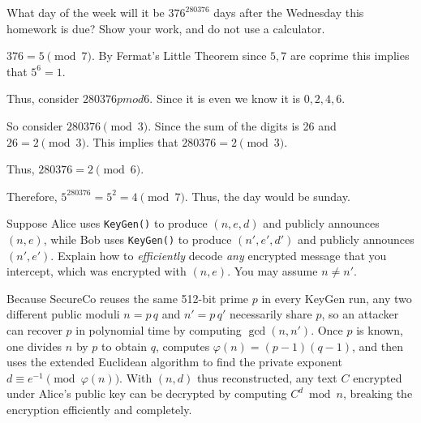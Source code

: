 \documentclass[12pt, letterpaper]{article}
\begin{document}
\begin{subproblem}{}
    What day of the week will it be $376^{280376}$ days after the Wednesday this homework is due?
  Show your work, and do not use a calculator.
\end{subproblem}
\begin{problemproof}
    $376=5 \pmod{7}$. By Fermat's Little Theorem since $5,7$ are coprime this implies that $5^6=1$.

    Thus, consider $280376 pmod{6}$. Since it is even we know it is $0,2,4,6$.

    So consider $280376 \pmod{3}$. Since the sum of the digits is 26 and $26=2 \pmod{3}$. This implies that $280376=2 \pmod{3}$.

    Thus, $280376=2 \pmod{6}$.

    Therefore, $5^{280376}=5^2=4 \pmod{7}$. Thus, the day would be sunday.
\end{problemproof}

\begin{problem}{}
    Suppose Alice uses \texttt{KeyGen()} to produce $(n,e,d)$ and publicly announces $(n,e)$, while Bob uses \texttt{KeyGen()} to produce $(n',e',d')$ and publicly announces $(n',e')$.  Explain how to \emph{efficiently} 
decode \emph{any} encrypted message that 
you intercept, which was encrypted 
with $(n,e)$. You may assume $n\neq n'$.
\end{problem}
\begin{problemproof}
    Because SecureCo reuses the same 512-bit prime \(p\) in every KeyGen run, any two different public moduli \(n = p\,q\) and \(n' = p\,q'\) necessarily share \(p\), so an attacker can recover \(p\) in polynomial time by computing \(\gcd(n,n')\).  Once \(p\) is known, one divides \(n\) by \(p\) to obtain \(q\), computes \(\varphi(n) = (p-1)(q-1)\), and then uses the extended Euclidean algorithm to find the private exponent \(d\equiv e^{-1}\pmod{\varphi(n)}\).  With \((n,d)\) thus reconstructed, any text \(C\) encrypted under Alice's public key can be decrypted by computing \(C^d\bmod n\), breaking the encryption efficiently and completely.
\end{problemproof}
\end{document}
